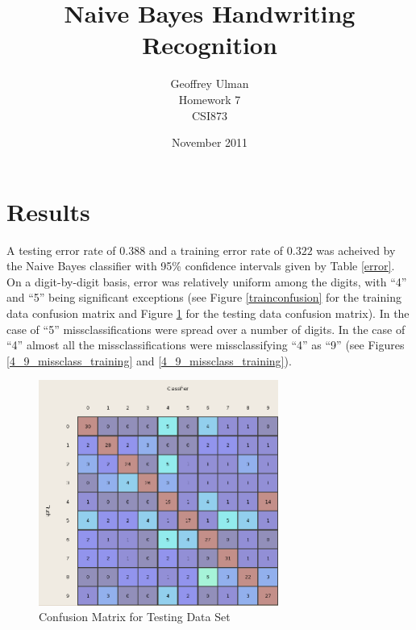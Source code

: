 \documentclass{article}
\begin{document}
\title{Naive Bayes Handwriting Recognition}
\author{Geoffrey Ulman\\
        Homework 7\\
        CSI873}
\date{November 2011}
\maketitle

\section{Results}\label{Results}

A testing error rate of \(0.388\) and a training error rate of \(0.322\) was acheived by the Naive Bayes classifier with 95\% confidence intervals given by Table \ref{error}. On a digit-by-digit basis, error was relatively uniform among the digits, with ``4'' and ``5'' being significant exceptions (see Figure \ref{trainconfusion} for the training data confusion matrix and Figure \ref{testconfusion} for the testing data confusion matrix). In the case of ``5'' missclassifications were spread over a number of digits. In the case of ``4'' almost all the missclassifications were missclassifying ``4'' as ``9'' (see Figures \ref{4_9_missclass_training} and \ref{4_9_missclass_training}).

\begin{figure}
\centering
\includegraphics[width=0.7\textwidth]{ConfusionMatrixTesting.png}
\caption{Confusion Matrix for Testing Data Set}
\label{testconfusion}
\end{figure}
\end{document}
